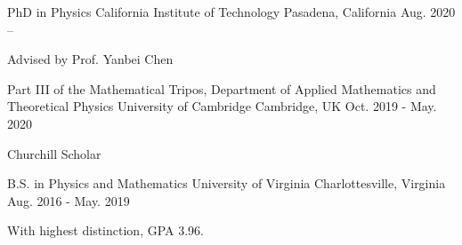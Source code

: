 


\begin{cventries}

  \cventry
    {PhD  in Physics} %
    {California Institute of Technology} %
    {Pasadena, California} %
    {Aug. 2020 --} %
    {
      \begin{cvitems} %
        \item {Advised by Prof. Yanbei Chen \\}
      \end{cvitems}
    }
  \cventry
    { Part III of the Mathematical Tripos, Department of Applied Mathematics and Theoretical Physics} %
    {University of Cambridge} %
    {Cambridge, UK} %
    {Oct. 2019 - May. 2020} %
    {
      \begin{cvitems} %
        \item {Churchill Scholar\\}
      \end{cvitems}
    }
  \cventry
    {B.S. in Physics and Mathematics} %
    {University of Virginia} %
    {Charlottesville, Virginia} %
    {Aug. 2016 - May. 2019} %
    {
      \begin{cvitems} %
        \item {With highest distinction, GPA 3.96.}
      \end{cvitems}
    }

\end{cventries}
